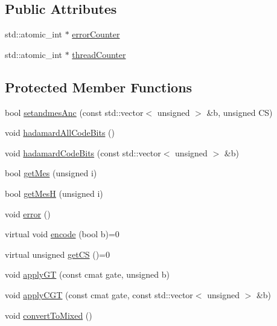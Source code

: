 \subsection*{Public Attributes}
\begin{DoxyCompactItemize}
\item 
std\+::atomic\+\_\+int $\ast$ \hyperlink{class_code_ab4f00a8ff5a23276a54c7b163b34219a}{error\+Counter}
\item 
std\+::atomic\+\_\+int $\ast$ \hyperlink{class_code_a3c6a29ddf07c39bda3e78d05cada42b5}{thread\+Counter}
\end{DoxyCompactItemize}
\subsection*{Protected Member Functions}
\begin{DoxyCompactItemize}
\item 
bool \hyperlink{class_code_a30cba39121d9b63fd3344f639fe42487}{setandmes\+Anc} (const std\+::vector$<$ unsigned $>$ \&b, unsigned CS)
\item 
void \hyperlink{class_code_ad554df1048f44e7e02404e9670a3d8de}{hadamard\+All\+Code\+Bits} ()
\item 
void \hyperlink{class_code_ac67d0cdd389466240874cc124137b6ac}{hadamard\+Code\+Bits} (const std\+::vector$<$ unsigned $>$ \&b)
\item 
bool \hyperlink{class_code_ac1116dcd1573b570cfee1a044f4526a9}{get\+Mes} (unsigned i)
\item 
bool \hyperlink{class_code_a080e5bd0105b1f02a5c3568b01a7758a}{get\+MesH} (unsigned i)
\item 
void \hyperlink{class_code_af87289ca8b76769d7a572a0d1b324155}{error} ()
\item 
virtual void \hyperlink{class_code_a5f90b0f96002c9b999d8ed7bab319906}{encode} (bool b)=0
\item 
virtual unsigned \hyperlink{class_code_a34f52b25d78aeaec3c1fd381f025ad00}{get\+CS} ()=0
\item 
void \hyperlink{class_code_a63474ffa6825d0efcfa8a40cac225d4a}{apply\+GT} (const cmat gate, unsigned b)
\item 
void \hyperlink{class_code_a3fe9fc7acd3f4c9cc80d5fd39322ca04}{apply\+C\+GT} (const cmat gate, const std\+::vector$<$ unsigned $>$ \&b)
\item 
void \hyperlink{class_code_ae26ecba630093dcac2b7c01946678cb0}{convert\+To\+Mixed} ()
\end{DoxyCompactItemize}
